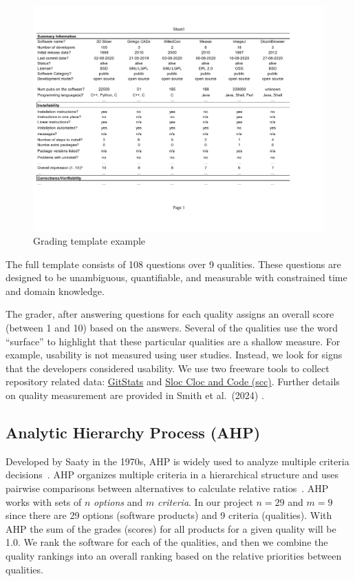 \documentclass[draft, 12pt, 3p, times]{elsarticle} %
\begin{document}
\begin{figure}[ht!]
\includegraphics[scale=0.67]{Figure1_template}
\caption{Grading template example}
\label{fg_grading_template_example}
\end{figure}

The full template consists of 108 questions over 9 qualities.  These
questions are designed to be unambiguous, quantifiable, and measurable
with constrained time and domain knowledge.

The grader, after answering questions for each quality assigns an overall
score (between 1 and 10) based on the answers.  Several of the qualities use
the word ``surface'' to highlight that these particular qualities are a shallow
measure.  For example, usability is not measured using user studies.
Instead, we look for signs that the developers considered usability.
We use two freeware tools to collect repository related data:
\href{https://github.com/tomgi/git_stats}{GitStats} and
\href{https://github.com/boyter/scc}{Sloc Cloc and Code (scc)}.  Further
details on quality measurement are provided in Smith et al.\ (2024) \cite{SmithEtAl2024_MI_SOP}. 

\subsection{Analytic Hierarchy Process (AHP)} \label{sec_AHP}

Developed by Saaty in the 1970s, AHP is widely used to analyze multiple criteria
decisions~\cite{VaidyaEtAl2006}. AHP organizes multiple criteria in a
hierarchical structure and uses pairwise comparisons between alternatives to
calculate relative ratios~\cite{Saaty1990}. AHP works with sets of $n$
\textit{options} and $m$ \textit{criteria}.  In our project $n=29$ and $m=9$
since there are 29 options (software products) and 9 criteria (qualities). With
AHP the sum of the grades (scores) for all products for a given quality will be
1.0.  We rank the software for each of the qualities, and then we combine the
quality rankings into an overall ranking based on the relative priorities
between qualities.
\end{document}

